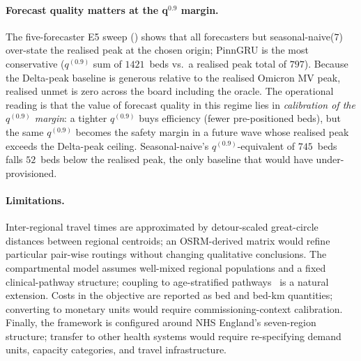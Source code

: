 \paragraph{Forecast quality matters at the q$^{0.9}$ margin.}
The five-forecaster E5 sweep () shows that all
forecasters but seasonal-naive($7$) over-state the realised peak at
the chosen origin; PinnGRU is the most conservative ($q^{(0.9)}$ sum
of $1421$~beds vs.\ a realised peak total of $797$). Because the
Delta-peak baseline is generous relative to the realised Omicron MV
peak, realised unmet is zero across the board including the oracle.
The operational reading is that the value of forecast quality in this
regime lies in \emph{calibration of the $q^{(0.9)}$ margin}: a tighter
$q^{(0.9)}$ buys efficiency (fewer pre-positioned beds), but the same
$q^{(0.9)}$ becomes the safety margin in a future wave whose realised
peak exceeds the Delta-peak ceiling. Seasonal-naive's
$q^{(0.9)}$-equivalent of $745$~beds falls $52$~beds below the
realised peak, the only baseline that would have under-provisioned.

\paragraph{Limitations.}
Inter-regional travel times are approximated by detour-scaled
great-circle distances between regional centroids; an OSRM-derived
matrix would refine particular pair-wise routings without changing
qualitative conclusions. The compartmental model assumes well-mixed
regional populations and a fixed clinical-pathway structure; coupling
to age-stratified pathways~\cite{shamseddin2025optimization} is a
natural extension. Costs in the objective are reported as bed and
bed-km quantities; converting to monetary units would require
commissioning-context calibration. Finally, the framework is
configured around NHS England's seven-region structure; transfer to
other health systems would require re-specifying demand units,
capacity categories, and travel infrastructure.
